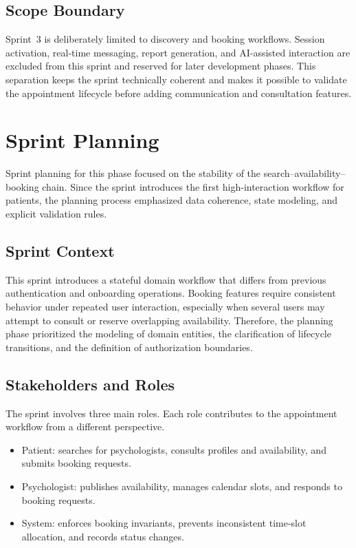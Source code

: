 \documentclass[a4paper,12pt]{report}
\begin{document}
\subsection{Scope Boundary}

Sprint~3 is deliberately limited to discovery and booking workflows. Session activation, real-time messaging, report generation, and AI-assisted interaction are excluded from this sprint and reserved for later development phases. This separation keeps the sprint technically coherent and makes it possible to validate the appointment lifecycle before adding communication and consultation features.

\section{Sprint Planning}
\label{sec:sprint3-planning}

Sprint planning for this phase focused on the stability of the search--availability--booking chain. Since the sprint introduces the first high-interaction workflow for patients, the planning process emphasized data coherence, state modeling, and explicit validation rules.

\subsection{Sprint Context}

This sprint introduces a stateful domain workflow that differs from previous authentication and onboarding operations. Booking features require consistent behavior under repeated user interaction, especially when several users may attempt to consult or reserve overlapping availability. Therefore, the planning phase prioritized the modeling of domain entities, the clarification of lifecycle transitions, and the definition of authorization boundaries.

\subsection{Stakeholders and Roles}

The sprint involves three main roles. Each role contributes to the appointment workflow from a different perspective.

\begin{itemize}[leftmargin=*]
  \item[--] Patient: searches for psychologists, consults profiles and availability, and submits booking requests.
  \item[--] Psychologist: publishes availability, manages calendar slots, and responds to booking requests.
  \item[--] System: enforces booking invariants, prevents inconsistent time-slot allocation, and records status changes.
\end{itemize}
\end{document}
